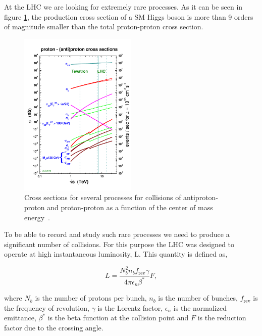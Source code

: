 At the \gls{LHC} we are looking for extremely rare processes. As it can be seen in figure \ref{FIGURE:ExperimentalApparatus_LHCCrossSections}, the production cross section of a \gls{SM} Higgs boson is more than 9 orders of magnitude smaller than the total proton-proton cross section. 

\begin{figure}[!htb]
  \centering
  \includegraphics[width=0.50\textwidth]{Chapter02/LHC/Images/crosssections2012_v5}
  \caption[Cross sections for several processes for collisions of antiproton-proton and proton-proton as a function of the center of mass energy.]
  {Cross sections for several processes for collisions of antiproton-proton and proton-proton as a function of the center of mass energy~\cite{ARTICLE:TheCMSExperiment}.}
  \label{FIGURE:ExperimentalApparatus_LHCCrossSections}
\end{figure}

To be able to record and study such rare processes we need to produce a significant number of collisions. For this purpose the \gls{LHC} was designed to operate at high instantaneous luminosity, L. This quantity is defined as,

\begin{equation}
L=\frac{N_{b}^{2}n_{b}f_{\text{rev}}\gamma}{4\pi\epsilon_{n}\beta^{*}}F,
\end{equation}

where $N_{b}$ is the number of protons per bunch, $n_{b}$ is the number of bunches, $f_{\text{rev}}$ is the frequency of revolution, $\gamma$ is the Lorentz factor, $\epsilon_{n}$ is the normalized emittance, $\beta^{*}$ is the beta function at the collision point and $F$ is the reduction factor due to the crossing angle.

